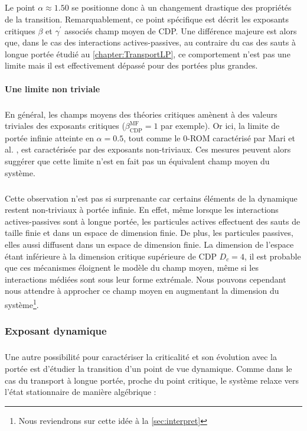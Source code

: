 \subparagraph{}Le point $\alpha\approx 1.50$ se positionne donc à un changement drastique des propriétés de la transition. Remarquablement, ce point spécifique est décrit les exposants critiques $\beta$ et $\gamma^\prime$ associés champ moyen de CDP. Une différence majeure est alors que, dans le cas des interactions actives-passives, au contraire du cas des sauts à longue portée étudié au \autoref{chapter:TransportLP}, ce comportement n'est pas une limite mais il est effectivement dépassé pour des portées plus grandes.

\paragraph{Une limite non triviale}

\subparagraph{}En général, les champs moyens des théories critiques amènent à des valeurs triviales des exposants critiques ($\beta_\text{CDP}^\text{MF}=1$ par exemple). Or ici, la limite de portée infinie atteinte en $\alpha=0.5$, tout comme le 0-ROM caractérisé par Mari et al. \cite{mari_absorbing_2022}, est caractérisée par des exposants non-triviaux. Ces mesures peuvent alors suggérer que cette limite n'est en fait pas un équivalent champ moyen du système. 

\subparagraph{}Cette observation n'est pas si surprenante car certains éléments de la dynamique restent non-triviaux à portée infinie. En effet, même lorsque les interactions actives-passives sont à longue portée, les particules actives effectuent des sauts de taille finie et dans un espace de dimension finie. De plus, les particules passives, elles aussi diffusent dans un espace de dimension finie. La dimension de l'espace étant inférieure à la dimension critique supérieure de CDP $D_c = 4$, il est probable que ces mécanismes éloignent le modèle du champ moyen, même si les interactions médiées sont sous leur forme extrémale. Nous pouvons cependant nous attendre à approcher ce champ moyen en augmentant la dimension du système\footnote{Nous reviendrons sur cette idée à la \autoref{sec:interpret}}.

\subsubsection{Exposant dynamique}

\label{sec:TBLRRdyn}

\subparagraph{}Une autre possibilité pour caractériser la criticalité et son évolution avec la portée est d'étudier la transition d'un point de vue dynamique. Comme dans le cas du transport à longue portée, proche du point critique, le système relaxe vers l'état stationnaire de manière algébrique :

